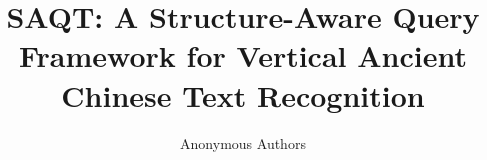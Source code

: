 \documentclass[runningheads]{llncs}
\begin{document}
\title{SAQT: A Structure-Aware Query Framework for Vertical Ancient Chinese Text Recognition}


\author{Anonymous Authors}

\maketitle











\end{document}
